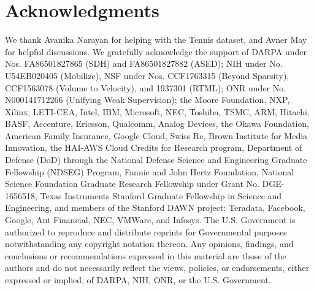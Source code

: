 \section*{Acknowledgments}


We thank Avanika Narayan for helping with the Tennis dataset, and Avner May for helpful discussions.
We gratefully acknowledge the support of DARPA under Nos. FA86501827865 (SDH) and FA86501827882 (ASED); NIH under No. U54EB020405 (Mobilize), NSF under Nos. CCF1763315 (Beyond Sparsity), CCF1563078 (Volume to Velocity), and 1937301 (RTML); ONR under No. N000141712266 (Unifying Weak Supervision); the Moore Foundation, NXP, Xilinx, LETI-CEA, Intel, IBM, Microsoft, NEC, Toshiba, TSMC, ARM, Hitachi, BASF, Accenture, Ericsson, Qualcomm, Analog Devices, the Okawa Foundation, American Family Insurance, Google Cloud, Swiss Re,
Brown Institute for Media Innovation, the HAI-AWS Cloud Credits for Research program,
Department of Defense (DoD) through the National Defense Science and
Engineering Graduate Fellowship (NDSEG) Program, 
Fannie and John Hertz Foundation,
National Science Foundation Graduate Research Fellowship under Grant No. DGE-1656518,
Texas Instruments Stanford Graduate Fellowship in Science and Engineering,
and members of the Stanford DAWN project: Teradata, Facebook, Google, Ant Financial, NEC, VMWare, and Infosys. The U.S. Government is authorized to reproduce and distribute reprints for Governmental purposes notwithstanding any copyright notation thereon. Any opinions, findings, and conclusions or recommendations expressed in this material are those of the authors and do not necessarily reflect the views, policies, or endorsements, either expressed or implied, of DARPA, NIH, ONR, or the U.S. Government.
